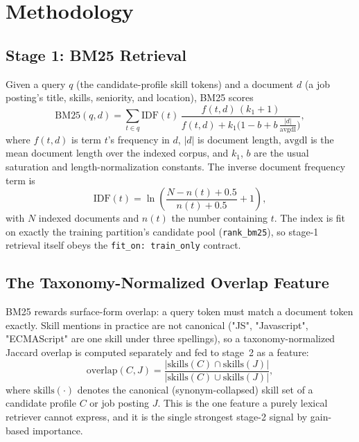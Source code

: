 \section{Methodology}
\subsection{Stage 1: BM25 Retrieval}
Given a query $q$ (the candidate-profile skill tokens) and a document $d$
(a job posting's title, skills, seniority, and location), BM25 scores
\[
\mathrm{BM25}(q,d)=\sum_{t\in q} \mathrm{IDF}(t)\,
\frac{f(t,d)\,(k_1+1)}{f(t,d)+k_1\big(1-b+b\,\tfrac{|d|}{\mathrm{avgdl}}\big)},
\]
where $f(t,d)$ is term $t$'s frequency in $d$, $|d|$ is document length,
$\mathrm{avgdl}$ is the mean document length over the indexed corpus, and
$k_1$, $b$ are the usual saturation and length-normalization constants. The
inverse document frequency term is
\[
\mathrm{IDF}(t)=\ln\!\left(\frac{N-n(t)+0.5}{n(t)+0.5}+1\right),
\]
with $N$ indexed documents and $n(t)$ the number containing $t$. The index
is fit on exactly the training partition's candidate pool (\texttt{rank\_bm25}),
so stage-1 retrieval itself obeys the \texttt{fit\_on: train\_only} contract.

\subsection{The Taxonomy-Normalized Overlap Feature}
BM25 rewards surface-form overlap: a query token must match a document
token exactly. Skill mentions in practice are not canonical ("JS",
"Javascript", "ECMAScript" are one skill under three spellings), so a
taxonomy-normalized Jaccard overlap is computed separately and fed to
stage~2 as a feature:
\[
\mathrm{overlap}(C,J) = \frac{|\mathrm{skills}(C)\cap\mathrm{skills}(J)|}
{|\mathrm{skills}(C)\cup\mathrm{skills}(J)|},
\]
where $\mathrm{skills}(\cdot)$ denotes the canonical (synonym-collapsed)
skill set of a candidate profile $C$ or job posting $J$. This is the one
feature a purely lexical retriever cannot express, and it is the single
strongest stage-2 signal by gain-based importance.


